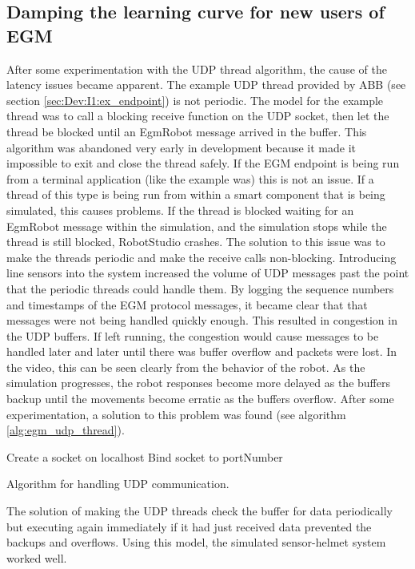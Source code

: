 \documentclass{cslthse-msc}
\begin{document}
\subsection{Damping the learning curve for new users of EGM}
\label{sec:Dev:I2:fixing_udp_thread}
After some experimentation with the UDP thread algorithm, the cause of the latency issues became apparent. The example UDP thread provided by ABB (see section \ref{sec:Dev:I1:ex_endpoint}) is not periodic. The model for the example thread was to call a blocking receive function on the UDP socket, then let the thread be blocked until an EgmRobot message arrived in the buffer. This algorithm was abandoned very early in development because it made it impossible to exit and close the thread safely. If the EGM endpoint is being run from a terminal application (like the example was) this is not an issue. If a thread of this type is being run from within a smart component that is being simulated, this causes problems. If the thread is blocked waiting for an EgmRobot message within the simulation, and the simulation stops while the thread is still blocked, RobotStudio crashes. The solution to this issue was to make the threads periodic and make the receive calls non-blocking. Introducing line sensors into the system increased the volume of UDP messages past the point that the periodic threads could handle them. By logging the sequence numbers and timestamps of the EGM protocol messages, it became clear that that messages were not being handled quickly enough. This resulted in congestion in the UDP buffers. If left running, the congestion would cause messages to be handled later and later until there was buffer overflow and packets were lost. In the video, this can be seen clearly from the behavior of the robot. As the simulation progresses, the robot responses become more delayed as the buffers backup until the movements become erratic as the buffers overflow. After some experimentation, a solution to this problem was found (see algorithm \ref{alg:egm_udp_thread}). 
\begin{algorithm}[H]
\label{alg:egm_udp_thread}
 Create a socket on localhost\;
 Bind socket to portNumber\;
 \caption{Algorithm for handling UDP communication.}
\end{algorithm}
$$ $$
The solution of making the UDP threads check the buffer for data periodically but executing again immediately if it had just received data prevented the backups and overflows. Using this model, the simulated sensor-helmet system worked well. 
\end{document}
